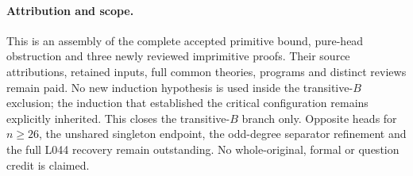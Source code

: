 \documentclass[11pt,a4paper]{article}
\begin{document}
\paragraph{Attribution and scope.}
This is an assembly of the complete accepted primitive bound,
pure-head obstruction and three newly reviewed imprimitive
proofs. Their source attributions, retained inputs, full common
theories, programs and distinct reviews remain paid. No new
induction hypothesis is used inside the transitive-$B$ exclusion;
the induction that established the critical configuration remains
explicitly inherited. This closes the transitive-$B$ branch only.
Opposite heads for $n\ge26$, the unshared singleton endpoint,
the odd-degree separator refinement and the full L044 recovery
remain outstanding. No whole-original, formal or question credit
is claimed.
\end{document}
